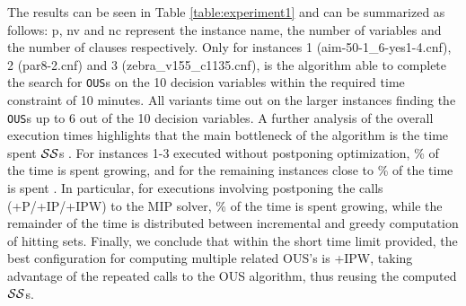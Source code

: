 The results can be seen in Table \ref{table:experiment1} and can be summarized as follows: p, nv and nc represent the instance name, the number of variables and the number of clauses respectively. 
Only for instances 1 (aim-50-1\_6-yes1-4.cnf), 2 (par8-2.cnf) and 3 (zebra\_v155\_c1135.cnf), is the algorithm able to complete the search for \texttt{OUS}s on the 10 decision variables within the required time constraint of 10 minutes.
All variants time out on the larger instances finding the \texttt{OUS}s up to 6 out of the 10 decision variables.
A further analysis of the overall execution times highlights that the main bottleneck of the algorithm is the time spent  $\mathcal{SS}$s
. For instances 1-3 executed without postponing optimization, \% of the time is spent growing, and for the remaining instances close to  \% of the time is spent  .
In particular, for executions involving postponing the calls (+P/+IP/+IPW) to the MIP solver, \% of the time is spent growing, while the remainder of the time is distributed between incremental and greedy computation of hitting sets.
Finally, we conclude that within the short time limit provided, the best configuration for computing multiple related OUS's is \omus+IPW, taking advantage of the repeated calls to the OUS algorithm, thus reusing the computed $\mathcal{SS}$s.

